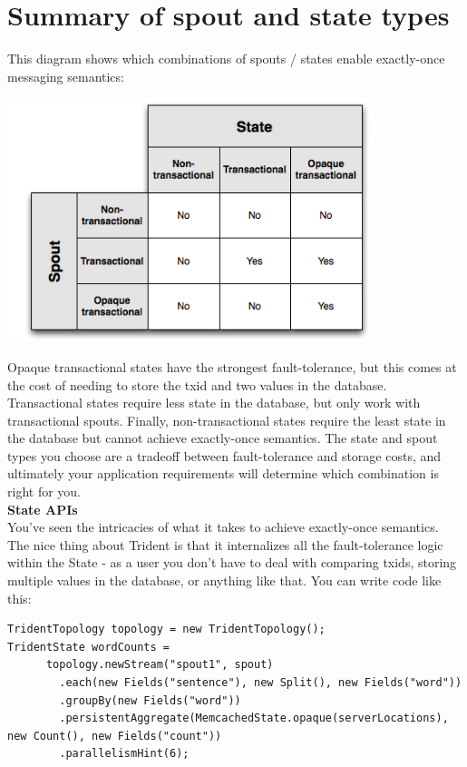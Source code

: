 \section{Summary of spout and state types}
This diagram shows which combinations of spouts / states enable exactly-once messaging semantics:\\[2mm]
\begin{center}
\includegraphics[scale=.7]{../img/img15} \\[2mm]
\end{center}
Opaque transactional states have the strongest fault-tolerance, but this comes at the cost of needing to store the txid and two values in the database. Transactional states require less state in the database, but only work with transactional spouts. Finally, non-transactional states require the least state in the database but cannot achieve exactly-once semantics.
The state and spout types you choose are a tradeoff between fault-tolerance and storage costs, and ultimately your application requirements will determine which combination is right for you.\\[2mm]
{\bfseries State APIs}\\[2mm]
You've seen the intricacies of what it takes to achieve exactly-once semantics. The nice thing about Trident is that it internalizes all the fault-tolerance logic within the State - as a user you don't have to deal with comparing txids, storing multiple values in the database, or anything like that. You can write code like this:\\[2mm]
\begin{verbatim}
TridentTopology topology = new TridentTopology();        
TridentState wordCounts =
      topology.newStream("spout1", spout)
        .each(new Fields("sentence"), new Split(), new Fields("word"))
        .groupBy(new Fields("word"))
        .persistentAggregate(MemcachedState.opaque(serverLocations), new Count(), new Fields("count"))                
        .parallelismHint(6);
\end{verbatim}
